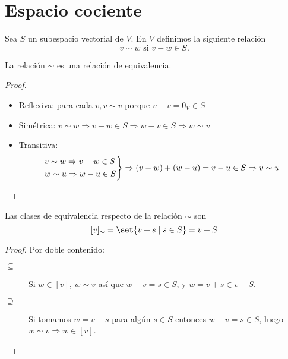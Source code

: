 \section{Espacio cociente}
\begin{definition}
	Sea \(S \) un subespacio vectorial de \(V \). En \(V \) definimos la siguiente relación
	\[
		v \sim w \text{ si } v - w \in S.
	\]
\end{definition}
\begin{proposition}
	La relación \(\sim \) es una relación de equivalencia.
\end{proposition}
\begin{proof}
	\begin{itemize}
		\item Reflexiva: para cada \(v, v \sim v \) porque \(v - v = 0_V \in S \)
		\item Simétrica: \(v \sim w \Rightarrow v - w \in S \Rightarrow w - v \in S \Rightarrow w \sim v\)
		\item Transitiva:
		      \[
			      \begin{rcases}
				      v \sim w \Rightarrow v - w \in S \\
				      w \sim u \Rightarrow w - u \in S
			      \end{rcases} \Rightarrow (v - w) + (w - u) = v-  u \in S \Rightarrow v \sim u
		      \]
	\end{itemize}
\end{proof}

\vspace{0.5cm}
\begin{proposition}
	Las clases de equivalencia respecto de la relación \(\sim \) son
	\[
		[v]_{\sim} = \set{v + s \mid s \in S} = v + S
	\]
\end{proposition}
\begin{proof}
	Por doble contenido:
	\begin{description}
		\item[\(\boxed{\subseteq}\)] Si \(w \in [v]\), \(w \sim v \) así que \(w - v = s \in S \), y \(w = v + s \in v + S \).
		\item[\(\boxed{\supseteq }\)] Si tomamos \(w = v + s \) para algún \(s \in S \) entonces \(w - v = s \in S \), luego \(w \sim v \Rightarrow w \in [v ]\).
	\end{description}
\end{proof}

